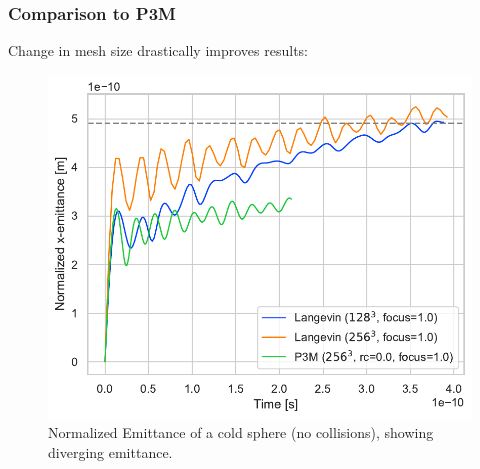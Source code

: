 \documentclass[.08pt,aspectratio=169]{beamer}
\begin{document}
\begin{frame}
    \frametitle{Comparison to P3M}

     Change in mesh size drastically improves results:

\begin{figure}[!htb]
  \includegraphics[width=0.5\linewidth]{figures/comparison_meshsize.pdf}
    \caption{Normalized Emittance of a cold sphere (no collisions), showing diverging emittance.} 
  \label{fig:awesome_image4}
\end{figure}

\end{frame}
\end{document}
